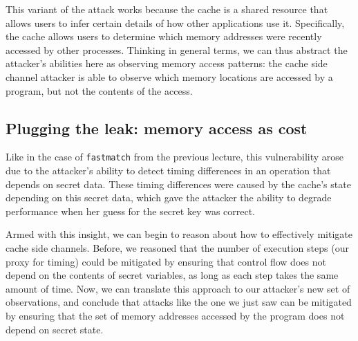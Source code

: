\documentclass[11pt,twoside]{scrartcl}
\begin{document}
This variant of the attack works because the cache is a shared resource that allows users to infer certain details of how other applications use it. Specifically, the cache allows users to determine which memory addresses were recently accessed by other processes. Thinking in general terms, we can thus abstract the attacker's abilities here as observing memory access patterns: the cache side channel attacker is able to observe which memory locations are accessed by a program, but not the contents of the access.

\subsection{Plugging the leak: memory access as cost} 

Like in the case of \texttt{fastmatch} from the previous lecture, this vulnerability arose due to the attacker's ability to detect timing differences in an operation that depends on secret data. These timing differences were caused by the cache's state depending on this secret data, which gave the attacker the ability to degrade performance when her guess for the secret key was correct.

Armed with this insight, we can begin to reason about how to effectively mitigate cache side channels. Before, we reasoned that the number of execution steps (our proxy for timing) could be mitigated by ensuring that control flow does not depend on the contents of secret variables, as long as each step takes the same amount of time. Now, we can translate this approach to our attacker's new set of observations, and conclude that attacks like the one we just saw can be mitigated by ensuring that the set of memory addresses accessed by the program does not depend on secret state.
\end{document}
